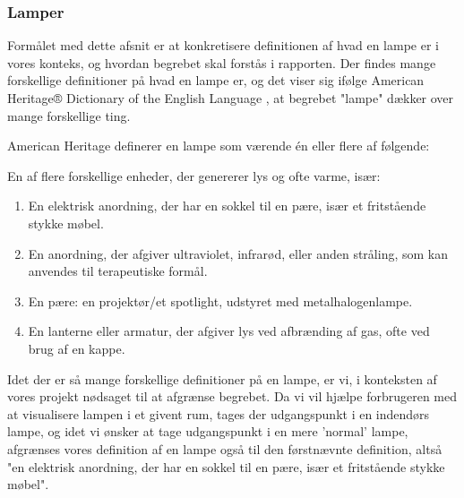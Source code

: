 \subsubsection{Lamper}
Formålet med dette afsnit er at konkretisere definitionen af hvad en lampe er i vores konteks, og hvordan begrebet skal forstås i rapporten.
Der findes mange forskellige definitioner på hvad en lampe er, og det viser sig ifølge American Heritage® Dictionary of the English Language \cite{american_heritage}, at begrebet "lampe" dækker over mange forskellige ting. 

American Heritage definerer en lampe som værende én eller flere af følgende:

En af flere forskellige enheder, der genererer lys og ofte varme, især:
\begin{enumerate}
    \item En elektrisk anordning, der har en sokkel til en pære, især et fritstående stykke møbel.
    \item En anordning, der afgiver ultraviolet, infrarød, eller anden stråling, som kan anvendes til terapeutiske formål.
    \item En pære: en projektør/et spotlight, udstyret med metalhalogenlampe.
    \item En lanterne eller armatur, der afgiver lys ved afbrænding af gas, ofte ved brug af en kappe.
\end{enumerate}

Idet der er så mange forskellige definitioner på en lampe, er vi, i konteksten af vores projekt nødsaget til at afgrænse begrebet. Da vi vil hjælpe forbrugeren med at visualisere lampen i et givent rum, tages der udgangspunkt i en indendørs lampe, og idet vi ønsker at tage udgangspunkt i en mere 'normal' lampe, afgrænses vores definition af en lampe også til den førstnævnte definition, altså "en elektrisk anordning, der har en sokkel til en pære, især et fritstående stykke møbel".



